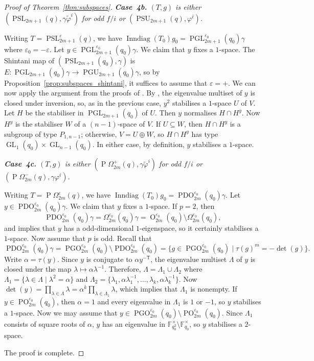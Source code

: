 \documentclass[11pt]{article}
\numberwithin{equation}{section}
\theoremstyle{shdefinition}
\theoremstyle{shplain}
\renewcommand{\a}{\alpha}
\newcommand{\g}{\gamma}
\newcommand{\e}{\varepsilon}
\newcommand{\p}{\varphi}
\renewcommand{\wp}{\widetilde{\varphi}}
\renewcommand{\l}{\lambda}
\renewcommand{\t}{\tau}
\newcommand{\<}{\langle}
\renewcommand{\>}{\rangle}
\newcommand{\Inndiag}{\operatorname{Inndiag}}
\newcommand{\tr}{\mathsf{T}}
\newcommand{\F}{\mathbb{F}}
\renewcommand{\:}{\colon}
\newcommand{\GL}{\operatorname{GL}}
\newcommand{\PSL}{\operatorname{PSL}}
\newcommand{\PGL}{\operatorname{PGL}}
\newcommand{\PSU}{\operatorname{PSU}}
\newcommand{\PGU}{\operatorname{PGU}}
\newcommand{\Om}{\Omega}
\renewcommand{\O}{\operatorname{O}}
\newcommand{\POm}{\operatorname{P}\!\Om}
\newcommand{\PO}{\operatorname{PO}}
\newcommand{\PDO}{\operatorname{PDO}}
\newcommand{\PGO}{\operatorname{PGO}}
\begin{document}
\begin{proof}[Proof of Theorem~\ref{thm:subspaces}]
\emph{\textbf{Case~4b.} $(T,g)$ is either $(\PSL_{2m+1}(q), \g\wp^i)$ for odd $f/i$ or $(\PSU_{2m+1}(q), \p^i)$.}\nopagebreak

Writing $T = \PSL^{\e}_{2m+1}(q)$, we have $\Inndiag(T_0)g_0 = \PGL^{\e_0}_{2m+1}(q_0)\g$ where $\e_0 = -\e$. Let $y \in \PGL^{\e_0}_{2m+1}(q_0)\g$. We claim that $y$ fixes a $1$-space. The Shintani map of $(\PSL_{2m+1}(q_0),\g)$ is $E\:\PGL_{2m+1}(q_0)\g \to \PGU_{2m+1}(q_0)\g$, so by Proposition~\ref{prop:subspaces_shintani}, it suffices to assume that $\e=+$. We can now apply the argument from the proofs of \cite[Propositions~5.8 and 6.4]{ref:BurnessGuest13}. By \cite[Theorem~4.2]{ref:FulmanGuralnick04}, the eigenvalue multiset of $y$ is closed under inversion, so, as in the previous case, $y^2$ stabilises a $1$-space $U$ of $V$. Let $H$ be the stabiliser in $\PGL_{2m+1}(q_0)$ of $U$. Then $y$ normalises $H \cap H^y$. Now $H^y$ is the stabiliser $W$ of a $(n-1)$-space of $V$. If $U \subseteq W$, then $H \cap H^y$ is a subgroup of type $P_{1,n-1}$; otherwise, $V = U \oplus W$, so $H \cap H^y$ has type $\GL_1(q_0) \times \GL_{n-1}(q_0)$. In either case, by definition, $y$ stabilises a $1$-space.

\emph{\textbf{Case~4c.} $(T,g)$ is either $(\POm^+_{2m}(q), \g\wp^i)$ for odd $f/i$ or $(\POm^-_{2m}(q),\g\p^i)$.}\nopagebreak

Writing $T = \POm^\e_{2m}(q)$, we have $\Inndiag(T_0)g_0 = \PDO^{\e_0}_{2m}(q_0)\g$. Let $y \in \PDO^{\e_0}_{2m}(q_0)\g$. We claim that $y$ fixes a $1$-space. If $p=2$, then 
\[
\PDO^{\e_0}_{2m}(q_0)\g = \Om^{\e_0}_{2m}(q_0)\g = \O^{\e_0}_{2m}(q_0) \setminus \Om^{\e_0}_{2m}(q_0),
\] 
and \cite[Theorem~11.43]{ref:Taylor92} implies that $y$ has a odd-dimensional $1$-eigenspace, so it certainly stabilises a $1$-space. Now assume that $p$ is odd. Recall that
\[
\PDO^{\e_0}_{2m}(q_0)\g = \PGO^{\e_0}_{2m}(q_0) \setminus \PDO^{\e_0}_{2m}(q_0) = \{ g \in \PGO^{\e_0}_{2m}(q_0) \mid \t(g)^m = -\det(g) \}.
\]
Write $\a = \t(y)$. Since $y$ is conjugate to $\a y^{-\tr}$, the eigenvalue multiset $\Lambda$ of $y$ is closed under the map $\l \mapsto \a\l^{-1}$. Therefore, $\Lambda = \Lambda_1 \cup \Lambda_2$ where $\Lambda_1 = \{ \l \in \Lambda \mid \l^2 = \a \}$ and $\Lambda_2 = \{ \l_1, \a\l_1^{-1}, \dots, \l_k, \a\l_k^{-1}\}$. Now $\det(y) = \prod_{\l \in \Lambda} \l = \a^k \prod_{\l \in \Lambda_1} \l$, which implies that $\Lambda_1$ is nonempty. If $y \in \PO^{\e_0}_{2m}(q_0)$, then $\a = 1$ and every eigenvalue in $\Lambda_1$ is $1$ or $-1$, so $y$ stabilises a $1$-space. Now we may assume that $y \in \PGO^{\e_0}_{2m}(q_0) \setminus \PO^{\e_0}_{2m}(q_0)$. Since $\Lambda_1$ consists of square roots of $\a$, $y$ has an eigenvalue in $\F_{q_0^2}^\times \setminus \F_{q_0}^\times$, so $y$ stabilises a $2$-space. 

The proof is complete.
\end{proof}
\end{document}
